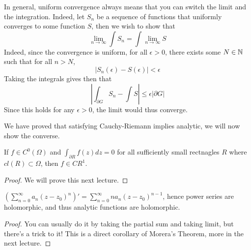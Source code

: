 \begin{remark}
    In general, uniform convergence always means that you can switch the limit and the integration. Indeed, let $S_n$ be a sequence of functions that uniformly converges to some function $S$, then we wish to show that
    \[\lim_{n \to \infty} \int S_n = \int \lim_{n \to \infty} S\]
    Indeed, since the convergence is uniform, for all $\epsilon > 0$, there exists some $N \in \mathbb{N}$ such that for all $n > N$,
    \[|S_n(\epsilon) - S(\epsilon)| < \epsilon\]
    Taking the integrals gives then that
    \[|\int_{\partial G} S_n - \int S| \leq \epsilon |\partial G|\]
    Since this holds for any $\epsilon > 0$, the limit would thus converge.
\end{remark}

We have proved that satisfying Cauchy-Riemann implies analytic, we will now show the converse.

\begin{theorem}
If $f \in C^0(\Omega)$ and $\int_{\partial R} f(z) dz = 0$ for all sufficiently small rectnagles $R$ where $cl(R) \subset \Omega$, then $f \in CR^1$.
\end{theorem}

\begin{proof}
We will prove this next lecture.
\end{proof}

\begin{theorem}
$(\sum_{n = 0}^\infty a_n (z - z_0)^n)' = \sum_{n = 0}^\infty n a_n (z - z_0)^{n-1}$, hence power series are holomorphic, and thus analytic functions are holomorphic.
\end{theorem}

\begin{proof}
You can usually do it by taking the partial sum and taking limit, but there's a trick to it! This is a direct corollary of Morera's Theorem, more in the next lecture.
\end{proof}